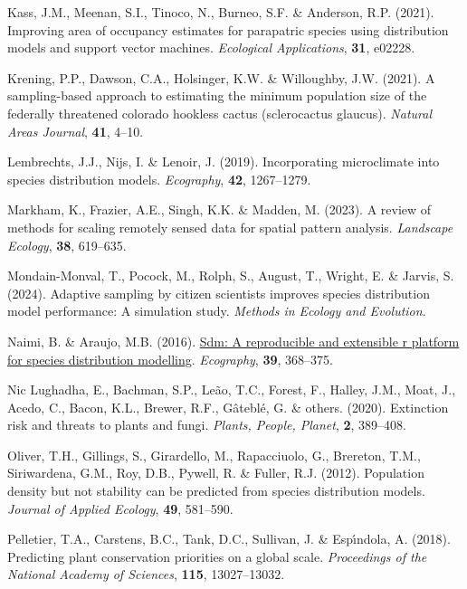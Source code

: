 \documentclass[
]{article}
\newlength{\cslhangindent}
\newenvironment{CSLReferences}[2] %
 {\begin{list}{}{%
  \setlength{\itemindent}{0pt}
  \setlength{\leftmargin}{0pt}
  \setlength{\parsep}{0pt}
  \ifodd #1
   \setlength{\leftmargin}{\cslhangindent}
   \setlength{\itemindent}{-1\cslhangindent}
  \fi
  \setlength{\itemsep}{#2\baselineskip}}}
 {\end{list}}
\begin{document}
\begin{CSLReferences}{1}{1}
Kass, J.M., Meenan, S.I., Tinoco, N., Burneo, S.F. \& Anderson, R.P.
(2021). Improving area of occupancy estimates for parapatric species
using distribution models and support vector machines. \emph{Ecological
Applications}, \textbf{31}, e02228.

Krening, P.P., Dawson, C.A., Holsinger, K.W. \& Willoughby, J.W. (2021).
A sampling-based approach to estimating the minimum population size of
the federally threatened colorado hookless cactus (sclerocactus
glaucus). \emph{Natural Areas Journal}, \textbf{41}, 4--10.

Lembrechts, J.J., Nijs, I. \& Lenoir, J. (2019). Incorporating
microclimate into species distribution models. \emph{Ecography},
\textbf{42}, 1267--1279.

Markham, K., Frazier, A.E., Singh, K.K. \& Madden, M. (2023). A review
of methods for scaling remotely sensed data for spatial pattern
analysis. \emph{Landscape Ecology}, \textbf{38}, 619--635.

Mondain-Monval, T., Pocock, M., Rolph, S., August, T., Wright, E. \&
Jarvis, S. (2024). Adaptive sampling by citizen scientists improves
species distribution model performance: A simulation study.
\emph{Methods in Ecology and Evolution}.

Naimi, B. \& Araujo, M.B. (2016).
\href{https://doi.org/10.1111/ecog.01881}{Sdm: A reproducible and
extensible r platform for species distribution modelling}.
\emph{Ecography}, \textbf{39}, 368--375.

Nic Lughadha, E., Bachman, S.P., Leão, T.C., Forest, F., Halley, J.M.,
Moat, J., Acedo, C., Bacon, K.L., Brewer, R.F., Gâteblé, G. \& others.
(2020). Extinction risk and threats to plants and fungi. \emph{Plants,
People, Planet}, \textbf{2}, 389--408.

Oliver, T.H., Gillings, S., Girardello, M., Rapacciuolo, G., Brereton,
T.M., Siriwardena, G.M., Roy, D.B., Pywell, R. \& Fuller, R.J. (2012).
Population density but not stability can be predicted from species
distribution models. \emph{Journal of Applied Ecology}, \textbf{49},
581--590.

Pelletier, T.A., Carstens, B.C., Tank, D.C., Sullivan, J. \& Espı́ndola,
A. (2018). Predicting plant conservation priorities on a global scale.
\emph{Proceedings of the National Academy of Sciences}, \textbf{115},
13027--13032.


\end{CSLReferences}
\end{document}
